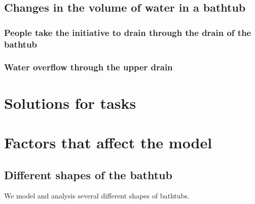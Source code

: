 \documentclass{mcmthesis}
\begin{document}
\subsection{Changes in the volume of water in a bathtub}

\subsubsection{People take the initiative to drain through the drain of the bathtub}

\subsubsection{Water overflow through the upper drain}
\section{Solutions for tasks}
\section{Factors that affect the model}
\subsection{Different shapes of the bathtub}
We model and analysis several different shapes of bathtubs.
\end{document}
